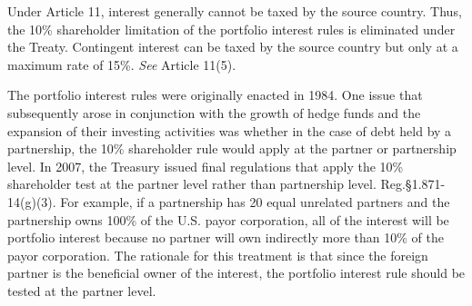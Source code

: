 Under Article 11, interest generally cannot be taxed by the source country.  Thus, the 10\% shareholder limitation of the portfolio interest rules is eliminated under the Treaty. Contingent interest can be taxed by the source country but only at a maximum rate of 15\%.  \emph{See} Article 11(5). 
 
The portfolio interest rules were originally enacted in 1984.  One issue that subsequently arose in conjunction with the growth of hedge funds and the expansion of their investing activities was whether in the case of debt held by a partnership, the 10\% shareholder rule would apply at the partner or partnership level.  In 2007, the Treasury issued final regulations that apply the 10\% shareholder test at the partner level rather than partnership level.  Reg.\@ \S 1.871-14(g)(3).  For example, if a partnership has 20 equal unrelated partners and the partnership owns 100\% of the U.S. payor corporation, all of the interest will be portfolio interest because no partner will own indirectly more than 10\% of the payor corporation.  The rationale for this treatment is that since the foreign partner is the beneficial owner of the interest, the portfolio interest rule should be tested at the partner level.   



